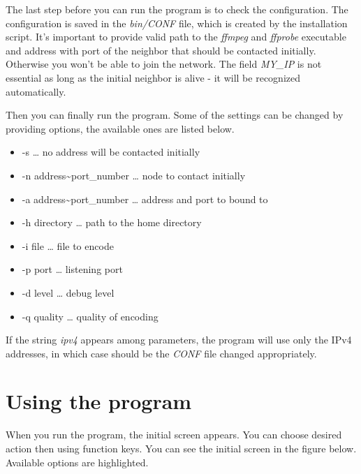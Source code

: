 The last step before you can run the program is to check the
configuration. The configuration is saved in the \textit{bin/CONF} file,
which is created by the installation script. It's important to provide
valid path to the \textit{ffmpeg} and \textit{ffprobe} executable and
address with port of the neighbor that should be contacted initially.
Otherwise you won't be able to join the network. The field \emph{MY\_IP}
is not essential as long as the initial neighbor is alive - it will be
recognized automatically.

Then you can finally run the program. Some of the settings can be
changed by providing options, the available ones are listed below.
\pagebreak

\begin{itemize}
\itemsep1pt\parskip0pt
\item
  -s \ldots{} no address will be contacted initially
\item
  -n address\textasciitilde{}port\_number \ldots{} node to contact
  initially
\item
  -a address\textasciitilde{}port\_number \ldots{} address and port to
  bound to
\item
  -h directory \ldots{} path to the home directory
\item
  -i file \ldots{} file to encode
\item
  -p port \ldots{} listening port
\item
  -d level \ldots{} debug level
\item
  -q quality \ldots{} quality of encoding
\end{itemize}

If the string \emph{ipv4} appears among parameters, the program will use
only the IPv4 addresses, in which case should be the \emph{CONF} file
changed appropriately.

\section{Using the program}\label{using-the-program}

When you run the program, the initial screen appears. You can choose
desired action then using function keys. You can see the initial screen
in the figure below. Available options are highlighted.

